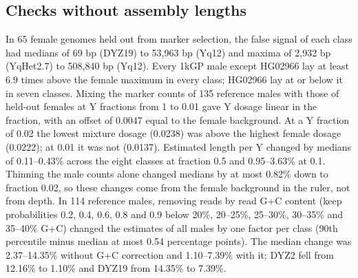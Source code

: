 \documentclass[pdflatex,sn-nature]{sn-jnl}
\begin{document}
\subsection{Checks without assembly lengths}\label{sec:res-truthfree}
In 65 female genomes held out from marker selection, the false signal of each class had medians of 69 bp (DYZ19) to 53,963 bp (Yq12) and maxima of 2,932 bp (YqHet2.7) to 508,840 bp (Yq12). Every 1kGP male except HG02966 lay at least 6.9 times above the female maximum in every class; HG02966 lay at or below it in seven classes. Mixing the marker counts of 135 reference males with those of held-out females at Y fractions from 1 to 0.01 gave Y dosage linear in the fraction, with an offset of 0.0047 equal to the female background. At a Y fraction of 0.02 the lowest mixture dosage (0.0238) was above the highest female dosage (0.0222); at 0.01 it was not (0.0137). Estimated length per Y changed by medians of 0.11--0.43\% across the eight classes at fraction 0.5 and 0.95--3.63\% at 0.1. Thinning the male counts alone changed medians by at most 0.82\% down to fraction 0.02, so these changes come from the female background in the ruler, not from depth. In 114 reference males, removing reads by read G+C content (keep probabilities 0.2, 0.4, 0.6, 0.8 and 0.9 below 20\%, 20--25\%, 25--30\%, 30--35\% and 35--40\% G+C) changed the estimates of all males by one factor per class (90th percentile minus median at most 0.54 percentage points). The median change was 2.37--14.35\% without G+C correction and 1.10--7.39\% with it; DYZ2 fell from 12.16\% to 1.10\% and DYZ19 from 14.35\% to 7.39\%.
\end{document}
